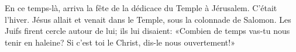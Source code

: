 En ce temps-là, arriva la fête de la dédicace du Temple à Jérusalem.
	C’était l’hiver.
Jésus allait et venait dans le Temple, sous la colonnade de Salomon.
Les Juifs firent cercle autour de lui; ils lui disaient:
	«Combien de temps vas-tu nous tenir en haleine?
	Si c’est toi le Christ, dis-le nous ouvertement!»
